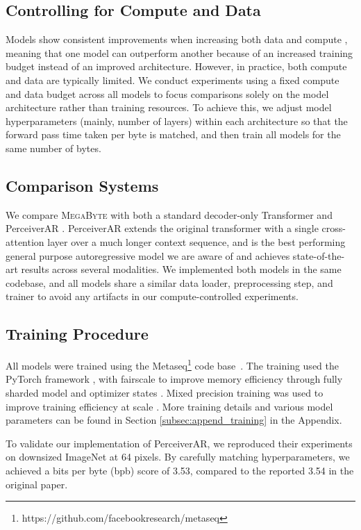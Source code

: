 \documentclass{article}
\newcommand{\fastslow}[0]{\textsc{MegaByte}\xspace}
\newcommand{\megabyte}[0]{\fastslow}
\theoremstyle{plain}
\theoremstyle{definition}
\theoremstyle{remark}
\begin{document}
\subsection{Controlling for Compute and Data}
    \label{sec:controlled_exp}
Models show consistent improvements when increasing both data and compute \cite{kaplan2020scaling,Chinchilla}, meaning that one model can outperform another because of an increased training budget instead of an improved architecture. However, in practice, both compute and data are typically limited. We conduct experiments using a fixed compute and data budget across all models to focus comparisons solely on the model architecture rather than training resources. To achieve this, we adjust model hyperparameters (mainly, number of layers) within each architecture so that the forward pass time taken per byte is matched, and then train all models for the same number of bytes.


\subsection{Comparison Systems}
We compare \megabyte with both a standard decoder-only Transformer and PerceiverAR \citep{perceiverar}. PerceiverAR extends the original transformer with a single cross-attention layer over a much longer context sequence, and is the best performing general purpose autoregressive model we are aware of 
 and achieves state-of-the-art results across several modalities. We implemented both models in the same codebase, and all models share a similar data loader, preprocessing step, and trainer to avoid any artifacts in our compute-controlled experiments.



\subsection{Training Procedure}
    \label{sec:training_proc}
    All models were trained using the Metaseq\footnote{https://github.com/facebookresearch/metaseq} code base~\cite{OPT}. The training used the PyTorch framework \cite{pytorch}, with fairscale to improve memory efficiency through fully sharded model and optimizer states \cite{fairscale}. Mixed precision training was used to improve training efficiency at scale \cite{mixedprecision}. More training details and various model parameters can be found in Section \ref{subsec:append_training} in the Appendix. 

To validate our implementation of PerceiverAR, we reproduced their experiments on downsized ImageNet at 64 pixels. By carefully matching hyperparameters, we achieved a bits per byte (bpb) score of 3.53, compared to the reported 3.54 in the original paper.
\end{document}
